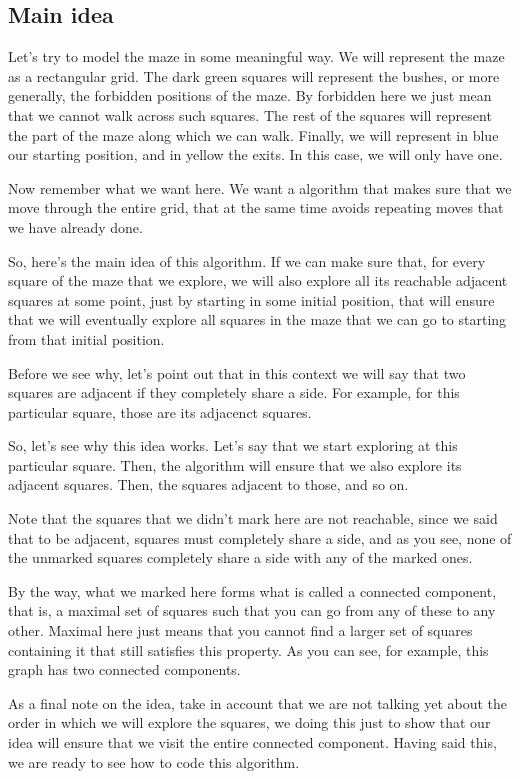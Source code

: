 \documentclass[12pt]{article}
\begin{document}
\subsection{Main idea}

Let's try to model the maze in some meaningful way.
We will represent the maze as a rectangular grid.
The dark green squares will represent the bushes,
or more generally, the forbidden positions of the maze. By
forbidden here we just mean that we cannot walk across
such squares. The rest of the squares will represent
the part of the maze along which we can walk.
Finally, we will represent in blue our starting 
position, and in yellow the exits. In this case, we will
only have one.

Now remember what we want here. We want a algorithm that makes
sure that we move through the entire grid, that at the same time
avoids repeating moves that we have already done.

So, here's the main idea of this algorithm. If we can make sure
that, for every square of the maze
that we explore, we will also explore all its 
reachable adjacent squares at some point,
just by starting in some initial position,
that will ensure that we will eventually explore all squares
in the maze that we can go to starting from that initial position.

Before we see why, let's point out that in this context we will
say that two squares are adjacent if they completely share
a side. For example, for this particular square, those are 
its adjacenct squares. 

So, let's see why this idea works.
Let's say that we start exploring at this particular square.
Then, the algorithm will ensure that we also explore its adjacent
squares. Then, the squares adjacent to those, and so on.

Note that the squares that we didn't mark here are not reachable,
since we said that to be adjacent, squares must completely share
a side, and as you see, none of the unmarked squares 
completely share a side with
any of the marked ones.

By the way, what we marked here forms what is called
a connected component, that is, a maximal
set of squares such that you can go from any of these to any other.
Maximal here just means that you cannot find a larger set
of squares containing it that still satisfies this property.
As you can see, for example, this graph has two connected components.

As a final note on the idea, take in account that we
are not talking yet about the order in which we will
explore the squares, we doing this just to show
that our idea will ensure that we visit the entire
connected component. Having said this, we are ready to see how
to code this algorithm.
\end{document}
